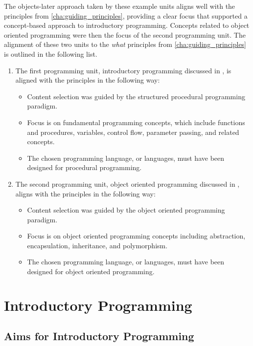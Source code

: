 The objects-later approach taken by these example units aligns well with the principles from \cref{cha:guiding_principles}, providing a clear focus that supported a concept-based approach to introductory programming. Concepts related to object oriented programming were then the focus of the second programming unit. The alignment of these two units to the \emph{what} principles from \cref{cha:guiding_principles} is outlined in the following list.
\begin{enumerate}
	\item The first programming unit, introductory programming discussed in , is aligned with the principles in the following way:
	\begin{itemize}[noitemsep,nolistsep]
		\item Content selection was guided by the structured procedural programming paradigm.
		\item Focus is on fundamental programming concepts, which include functions and procedures, variables, control flow, parameter passing, and related concepts.
		\item The chosen programming language, or languages, must have been designed for procedural programming.
	\end{itemize}
	\item The second programming unit, object oriented programming discussed in , aligns with the principles in the following way:
	\begin{itemize}[noitemsep,nolistsep]
		\item Content selection was guided by the object oriented programming paradigm.
		\item Focus is on object oriented programming concepts including abstraction, encapsulation, inheritance, and polymorphism.
		\item The chosen programming language, or languages, must have been designed for object oriented programming.
	\end{itemize}
\end{enumerate}

\clearpage
\section{Introductory Programming} %
\label{sec:introductory_programming}

\subsection{Aims for Introductory Programming} %
\label{ssub:intro:aims}

